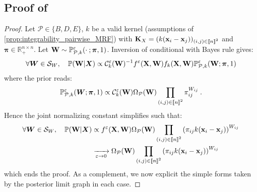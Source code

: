 \subsection{Proof of }
\label{proof:posterior_limit}

\posteriorW

\begin{proof}
Let $\mathcal{P} \in \{B, D, E\}$, $k$ be a valid kernel (assumptions of \cref{prop:integrability_pairwise_MRF}) with $\mathbf{K}_{X} = (k(\mathbf{x}_{i} - \mathbf{x}_{j}))_{(i,j) \in {[\![n]\!]}^2}$ and $\bm{\pi} \in \mathbb{R}_+^{n \times n}$. Let $\mathbf{W} \sim \mathbb{P}_{\mathcal{P},k}^{\varepsilon}(\cdot \: ; \bm{\pi},1)$. Inversion of conditional with Bayes rule gives:
\begin{align}
    \forall \bm{W} \in \mathcal{S}_{W}, \quad \mathbb{P}(\mathbf{W} | \bm{X}) \propto
    \mathcal{C}_{k}^{\varepsilon}(\mathbf{W})^{-1} f^{\varepsilon}(\mathbf{X}, \mathbf{W}) f_{k}(\mathbf{X}, \mathbf{W}) \mathbb{P}^{\varepsilon}_{\mathcal{P},k}(\mathbf{W}; \bm{\pi}, 1) \label{inversion_Conditional}
\end{align}
where the prior reads:
\begin{align}
    \mathbb{P}_{\mathcal{P},k}^{\varepsilon}(\bm{W}; \bm{\pi}, 1) \propto \mathcal{C}^{\varepsilon}_k(\mathbf{W}) \Omega_{\mathcal{P}}(\mathbf{W}) \prod_{(i,j) \in {[\![n]\!]}^2} \pi_{ij}^{W_{ij}} \:.
\end{align}
Hence the joint normalizing constant simplifies such that:
\begin{align}
    \forall \bm{W} \in \mathcal{S}_{W}, \quad \mathbb{P}(\mathbf{W} | \bm{X}) &\propto
    f^{\varepsilon}(\mathbf{X}, \mathbf{W}) \Omega_{\mathcal{P}}(\mathbf{W}) \prod_{(i,j) \in {[\![n]\!]}^2} \left(\pi_{ij} k(\mathbf{x}_i - \mathbf{x}_j)\right)^{W_{ij}} \\
    &\xrightarrow[\varepsilon \to 0]{} \Omega_{\mathcal{P}}(\mathbf{W}) \prod_{(i,j) \in {[\![n]\!]}^2}  \left(\pi_{ij} k(\mathbf{x}_i - \mathbf{x}_j)\right)^{W_{ij}}
\end{align}
which ends the proof. As a complement, we now explicit the simple forms taken by the posterior limit graph in each case.


\end{proof}
